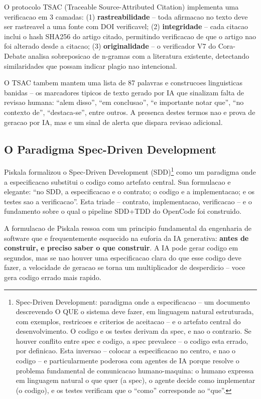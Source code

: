 \documentclass[12pt,a4paper,oneside,sumario=tradicional,chapter=TITLE,section=TITLE,subsection=TITLE,english,brazil]{abntex2}
\begin{document}
O protocolo TSAC (Traceable Source-Attributed Citation) \cite{macedo2026engenharia} implementa uma verificacao em 3 camadas: (1) \textbf{rastreabilidade} -- toda afirmacao no texto deve ser rastreavel a uma fonte com DOI verificavel; (2) \textbf{integridade} -- cada citacao inclui o hash SHA256 do artigo citado, permitindo verificacao de que o artigo nao foi alterado desde a citacao; (3) \textbf{originalidade} -- o verificador V7 do Cora-Debate analisa sobreposicao de n-gramas com a literatura existente, detectando similaridades que possam indicar plagio nao intencional.

O TSAC tambem mantem uma lista de 87 palavras e construcoes linguisticas banidas -- os marcadores tipicos de texto gerado por IA que sinalizam falta de revisao humana: ``alem disso'', ``em conclusao'', ``e importante notar que'', ``no contexto de'', ``destaca-se'', entre outros. A presenca destes termos nao e prova de geracao por IA, mas e um sinal de alerta que dispara revisao adicional.

\subsection{O Paradigma Spec-Driven Development}

Piskala \cite{piskala2026spec} formalizou o Spec-Driven Development (SDD)\footnote{Spec-Driven Development: paradigma onde a especificacao -- um documento descrevendo O QUE o sistema deve fazer, em linguagem natural estruturada, com exemplos, restricoes e criterios de aceitacao -- e o artefato central do desenvolvimento. O codigo e os testes derivam da spec, e nao o contrario. Se houver conflito entre spec e codigo, a spec prevalece -- o codigo esta errado, por definicao. Esta inversao -- colocar a especificacao no centro, e nao o codigo -- e particularmente poderosa com agentes de IA porque resolve o problema fundamental de comunicacao humano-maquina: o humano expressa em linguagem natural o que quer (a spec), o agente decide como implementar (o codigo), e os testes verificam que o ``como'' corresponde ao ``que''.} como um paradigma onde a especificacao substitui o codigo como artefato central. Sua formulacao e elegante: ``no SDD, a especificacao e o contrato; o codigo e a implementacao; e os testes sao a verificacao''. Esta triade -- contrato, implementacao, verificacao -- e o fundamento sobre o qual o pipeline SDD+TDD do OpenCode foi construido.

A formulacao de Piskala ressoa com um principio fundamental da engenharia de software que e frequentemente esquecido na euforia da IA generativa: \textbf{antes de construir, e preciso saber o que construir}. A IA pode gerar codigo em segundos, mas se nao houver uma especificacao clara do que esse codigo deve fazer, a velocidade de geracao se torna um multiplicador de desperdicio -- voce gera codigo errado mais rapido.
\end{document}
